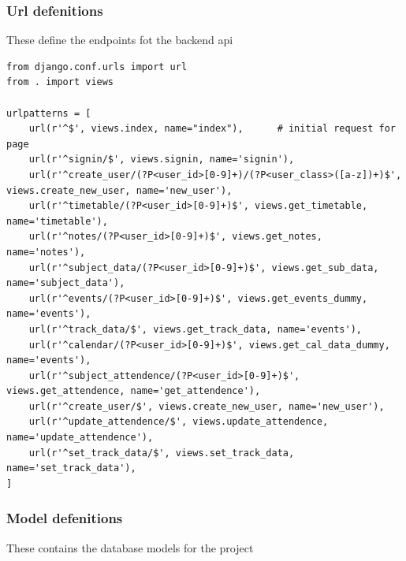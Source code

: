 \documentclass{article}
\begin{document}
\subsubsection{Url defenitions}
These define the endpoints fot the backend api
\vspace{1em}
\begin{lstlisting}
from django.conf.urls import url
from . import views

urlpatterns = [
    url(r'^$', views.index, name="index"),      # initial request for page
    url(r'^signin/$', views.signin, name='signin'),
    url(r'^create_user/(?P<user_id>[0-9]+)/(?P<user_class>([a-z])+)$', views.create_new_user, name='new_user'),
    url(r'^timetable/(?P<user_id>[0-9]+)$', views.get_timetable, name='timetable'),
    url(r'^notes/(?P<user_id>[0-9]+)$', views.get_notes, name='notes'),
    url(r'^subject_data/(?P<user_id>[0-9]+)$', views.get_sub_data, name='subject_data'),
    url(r'^events/(?P<user_id>[0-9]+)$', views.get_events_dummy, name='events'),
    url(r'^track_data/$', views.get_track_data, name='events'),
    url(r'^calendar/(?P<user_id>[0-9]+)$', views.get_cal_data_dummy, name='events'),
    url(r'^subject_attendence/(?P<user_id>[0-9]+)$', views.get_attendence, name='get_attendence'),
    url(r'^create_user/$', views.create_new_user, name='new_user'),
    url(r'^update_attendence/$', views.update_attendence, name='update_attendence'),
    url(r'^set_track_data/$', views.set_track_data, name='set_track_data'),
]
\end{lstlisting}


\subsubsection{Model defenitions}
These contains the database models for the project
\vspace{1em}
\end{document}
